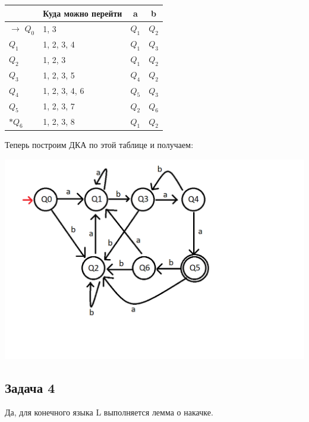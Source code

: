 \documentclass[a4paper,14pt]{article} %
\begin{document}
    \begin{tabular}{|l|l|l|l|}
    \hline
     & Куда можно перейти & \multicolumn{1}{c|}{a} & \multicolumn{1}{c|}{b} \\ \hline
    $\rightarrow$ $Q_0 $ & 1, 3               &  $Q_1$                      &  $Q_2$                      \\ \hline
    $Q_1 $ & 1, 2, 3, 4         &  $Q_1$                      &  $Q_3$                      \\ \hline
    $Q_2 $ & 1, 2, 3            &  $Q_1$                      &  $Q_2$                      \\ \hline
    $Q_3 $ & 1, 2, 3, 5         &  $Q_4$                      &  $Q_2$                      \\ \hline
    $Q_4 $ & 1, 2, 3, 4, 6      &  $Q_5$                      &  $Q_3$                      \\ \hline
    $Q_5 $ & 1, 2, 3, 7         &  $Q_2$                      &  $Q_6$                      \\ \hline
    $*Q_6 $ & 1, 2, 3, 8         &  $Q_1$                      &  $Q_2$                      \\ \hline
    \end{tabular}


    Теперь построим ДКА по этой таблице и получаем:

    \includegraphics[scale=1]{05.png}

    \newpage
    \subsection{Задача 4}
    Да, для конечного языка L выполняется лемма о накачке.
\end{document}
